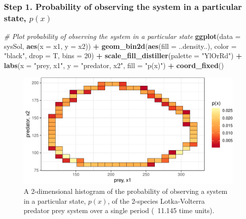 \documentclass[12pt,twoside,openany]{reedthesis}
\newenvironment{Shaded}{\begin{snugshade}}{\end{snugshade}}
\newcommand{\CommentTok}[1]{\textcolor[rgb]{0.56,0.35,0.01}{\textit{#1}}}
\newcommand{\DataTypeTok}[1]{\textcolor[rgb]{0.13,0.29,0.53}{#1}}
\newcommand{\DecValTok}[1]{\textcolor[rgb]{0.00,0.00,0.81}{#1}}
\newcommand{\KeywordTok}[1]{\textcolor[rgb]{0.13,0.29,0.53}{\textbf{#1}}}
\newcommand{\NormalTok}[1]{#1}
\newcommand{\OperatorTok}[1]{\textcolor[rgb]{0.81,0.36,0.00}{\textbf{#1}}}
\newcommand{\StringTok}[1]{\textcolor[rgb]{0.31,0.60,0.02}{#1}}
\begin{document}
\hypertarget{step-1.-probability-of-observing-the-system-in-a-particular-state-px}{%
\subsubsection{\texorpdfstring{\textbf{Step 1. Probability of observing the system in a particular state, \(p(x)\)}}{Step 1. Probability of observing the system in a particular state, p(x)}}\label{step-1.-probability-of-observing-the-system-in-a-particular-state-px}}
\begin{Shaded}
\begin{Highlighting}[]
\CommentTok{# Plot probability of observing the system in a particular state}
\KeywordTok{ggplot}\NormalTok{(}\DataTypeTok{data =}\NormalTok{ sysSol, }\KeywordTok{aes}\NormalTok{(}\DataTypeTok{x =}\NormalTok{ x1, }\DataTypeTok{y =}\NormalTok{ x2)) }\OperatorTok{+}
\StringTok{  }\KeywordTok{geom_bin2d}\NormalTok{(}\KeywordTok{aes}\NormalTok{(}\DataTypeTok{fill =}\NormalTok{ ..density..), }\DataTypeTok{color =} \StringTok{"black"}\NormalTok{, }\DataTypeTok{drop =}\NormalTok{ T, }\DataTypeTok{bins =} \DecValTok{20}\NormalTok{) }\OperatorTok{+}
\StringTok{  }\KeywordTok{scale_fill_distiller}\NormalTok{(}\DataTypeTok{palette =} \StringTok{"YlOrRd"}\NormalTok{) }\OperatorTok{+}
\StringTok{  }\KeywordTok{labs}\NormalTok{(}\DataTypeTok{x =} \StringTok{"prey, x1"}\NormalTok{, }\DataTypeTok{y =} \StringTok{"predator, x2"}\NormalTok{, }\DataTypeTok{fill =} \StringTok{"p(x)"}\NormalTok{) }\OperatorTok{+}
\StringTok{  }\KeywordTok{coord_fixed}\NormalTok{()}
\end{Highlighting}
\end{Shaded}
\begin{figure}
\includegraphics[width=0.85\linewidth]{_myDissertation_files/figure-latex/2D-hist-1} \caption{A 2-dimensional histogram of the probability of observing a system in a particular state, $p(x)$, of the 2-species Lotka-Volterra predator prey system over a single period (~11.145 time units).}\label{fig:2D-hist}
\end{figure}
\end{document}
